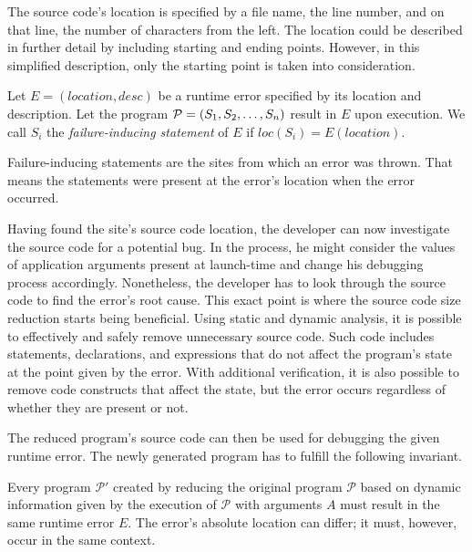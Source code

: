 The source code's location is specified by a file name, the line number, and 
on that line, the number of characters from the left.
The location could be described in further detail by including starting and 
ending points.
However, in this simplified description, only the starting point is taken 
into consideration.

\begin{defn}\label{def04:2}
  Let $E = (location, desc)$ be a runtime error specified by its location 
  and description. Let the program $\mathcal{P} = (S_1, S_2, \ldots,\-S_n)$
  result in $E$ upon execution.
  We call $S_i$ the \emph{failure-inducing statement} of 
  $E$ if $loc(S_i) = E(location)$.
\end{defn}

Failure-inducing statements are the sites from which an error was thrown.
That means the statements were present at the error's location when the error 
occurred.

Having found the site's source code location, the developer can now 
investigate the source code for a potential bug.
In the process, he might consider the values of application arguments 
present at launch-time and change his debugging process accordingly.
Nonetheless, the developer has to look through the source code to find 
the error's root cause.
This exact point is where the source code size reduction starts being 
beneficial.
Using static and dynamic analysis, it is possible to effectively and 
safely remove unnecessary source code.
Such code includes statements, declarations, and expressions that do not 
affect the program's state at the point given by the error.
With additional verification, it is also possible to remove code constructs 
that affect the state, but the error occurs regardless of whether they 
are present or not.

The reduced program's source code can then be used for debugging the given
runtime error.
The newly generated program has to fulfill the following invariant.

\begin{invar}\label{invar04:1}
  Every program $\mathcal{P'}$ created by reducing the original program 
  $\mathcal{P}$ based on dynamic information given by the execution of
  $\mathcal{P}$ with arguments $A$ must result in the same runtime error $E$.
  The error's absolute location can differ; it must, however, occur in the 
  same context.
\end{invar}


